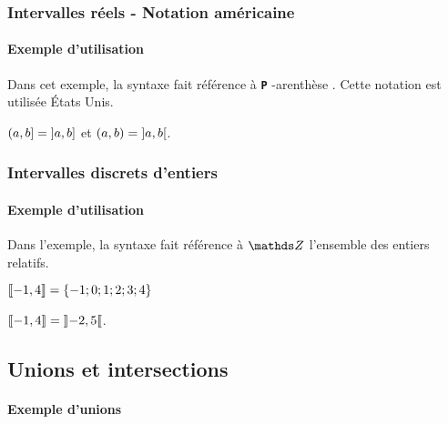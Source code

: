 \documentclass[12pt,a4paper]{article}
\theoremstyle{definition}
\newcommand\whyprefix[2]{%
	\textbf{\prefix{#1}}-#2%
}
\newcommand\prefix[1]{%
	\texttt{#1}%
}
\begin{document}


\subsubsection{Intervalles réels - Notation américaine}

\paragraph{Exemple d'utilisation}

Dans cet exemple, la syntaxe fait référence à \whyprefix{P}{arenthèse}. Cette notation est utilisée États Unis.

\begin{latexex}
$\intervalPC{a}{b} = \intervalOC{a}{b}$ et
$\intervalP{a}{b} = \intervalO{a}{b}$.
\end{latexex}




\subsubsection{Intervalles discrets d'entiers}

\paragraph{Exemple d'utilisation}

Dans l'exemple, la syntaxe fait référence à $\ZZ$ l'ensemble des entiers relatifs.

\begin{latexex}
$\ZintervalC{-1}{4} 
 = \{ -1 ; 0 ; 1 ; 2 ; 3 ; 4 \}$
 
$\ZintervalC{-1}{4} 
 = \ZintervalO{-2}{5}$.
\end{latexex}



\subsection{Unions et intersections}

\paragraph{Exemple d'unions}
\end{document}
